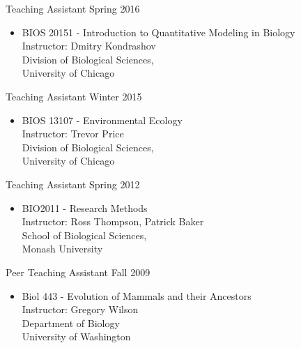 \documentclass[10pt]{article}
\renewcommand{\section}[1]{\pagebreak[3]%
    \hyphenpenalty=10000%
    \vspace{1.3\baselineskip}%
    \phantomsection\addcontentsline{toc}{section}{#1}%
    \noindent\llap{\scshape\smash{\parbox[t]{\marginparwidth}{\raggedright #1}}}%
    \vspace{-\baselineskip}\par}
\newenvironment{innerlist}[1][\enskip\textbullet]%
        {\begin{itemize}[#1,leftmargin=*,parsep=0pt,itemsep=0pt,topsep=0pt,partopsep=0pt]}
        {\end{itemize}}
\newcommand{\halfblankline}{\quad\vspace{-0.5\baselineskip}\pagebreak[3]}
\begin{document}
Teaching Assistant \hfill {Spring 2016}
\begin{innerlist}
\item[] BIOS 20151 - Introduction to Quantitative Modeling in Biology\\
  Instructor: Dmitry Kondrashov\\
        Division of Biological Sciences,\\
        University of Chicago  
\end{innerlist}

Teaching Assistant \hfill {Winter 2015}
\begin{innerlist}
\item[] BIOS 13107 - Environmental Ecology \\
  Instructor: Trevor Price\\
        Division of Biological Sciences,\\
        University of Chicago  
\end{innerlist}

Teaching Assistant \hfill {Spring 2012}
\begin{innerlist}
\item[] BIO2011 - Research Methods \\
  Instructor: Ross Thompson, Patrick Baker\\
        School of Biological Sciences,\\
        Monash University
\end{innerlist}

Peer Teaching Assistant \hfill {Fall 2009}
\begin{innerlist}
\item[] Biol 443 - Evolution of Mammals and their Ancestors \\
  Instructor: Gregory Wilson\\
        Department of Biology \\
        University of Washington
\end{innerlist}

%
%
\end{document}
